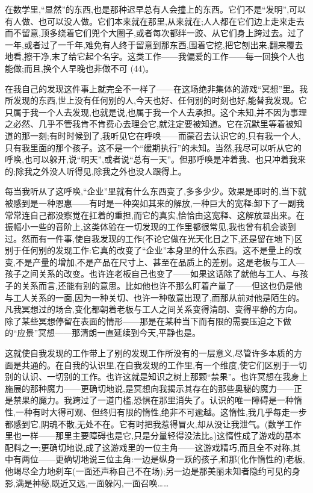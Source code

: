  在数学里,“显然”的东西,也是那种迟早总有人会撞上的东西。它们不是“发明”,可以有人做、也可以没人做。它们本来就在那里,从来就在;人人都在它们边上走来走去而不留意,顶多绕着它们兜个大圈子,或者每次都绊一跤、从它们身上跨过去。过了一年,或者过了一千年,难免有人终于留意到那东西,围着它挖,把它刨出来,翻来覆去地看,擦干净,末了给它起个名字。这类工作——我偏爱的工作——每一回换个人也能做;而且,换个人早晚也非做不可 (44)。

在我自己的发现这件事上就完全不一样了——在这场绝非集体的游戏“冥想”里。我所发现的东西,世上没有任何别的人,今天也好、任何别的时刻也好,能替我发现。它只属于我一个人去发现,也就是说,也属于我一个人去承担。这个未知,并不因为事理之必然、几乎不管我肯不肯费心去理会它,就注定要被知道。它在沉默里等着被知道的那一刻;有时时候到了,我听见它在呼唤——而蒙召去认识它的,只有我一个人,只有我里面的那个孩子。这不是一个“缓期执行”的未知。当然,我尽可以听从它的呼唤,也可以躲开,说“明天”,或者说“总有一天”。但那呼唤是冲着我、也只冲着我来的;除我之外没人听得见,除我之外也没人跟得上。

每当我听从了这呼唤,“企业”里就有什么东西变了,多多少少。效果是即时的,当下就被感到是一种恩惠——有时是一种突如其来的解放,一种巨大的宽释:卸下了一副我常常连自己都没察觉在扛着的重担,而它的真实,恰恰由这宽释、这解放显出来。在振幅小一些的音阶上,这类体验在一切发现的工作里都很常见,我也曾有机会谈到过。然而有一件事,使自我发现的工作(不论它做在光天化日之下,还是留在地下)区别于任何别的发现工作:它真的改变了“企业”本身里的什么东西。这不是量上的改变,不是产量的增加,不是产品在尺寸上、甚至在品质上的差别。这是老板与工人—孩子之间关系的改变。也许连老板自己也变了——如果这话除了就他与工人、与孩子的关系而言,还能有别的意思。比如他也许不那么盯着产量了——但这也仍是他与工人关系的一面,因为一种关切、也许一种敬意出现了,而那从前对他是陌生的。凡我冥想过的场合,变化都朝着老板与工人之间关系变得清朗、变得平静的方向。除了某些冥想停留在表面的情形——那是在某种当下而有限的需要压迫之下做的“应景”冥想——那清朗一直延续到今天,平静也是。

 这就使自我发现的工作带上了别的发现工作所没有的一层意义,尽管许多本质的方面是共通的。在自我的认识里,在自我发现的工作里,有一个维度,使它们区别于一切别的认识、一切别的工作。也许这就是知识之树上那颗“禁果”。也许冥想在我身上施展的那种魔力——更确切地说,是冥想向我揭示其存在的那些奥秘的魔力——正是禁果的魔力。我跨过了一道门槛,恐惧在那里消失了。认识的唯一障碍是一种惰性,一种有时大得可观、但终归有限的惰性,绝非不可逾越。这惰性,我几乎每走一步都感到它,阴魂不散,无处不在。它有时把我惹得冒火,却从没让我泄气。(数学工作里也一样——那里主要障碍也是它,只是分量轻得没法比。)这惰性成了游戏的基本配料之一;更确切地说,成了这游戏里的一位主角——这游戏精巧,而且全不对称,其中有两位——更确切地说三位主角:一边是纵身一跃的孩子,和那(化作惰性的)老板,他竭尽全力地刹车(一面还声称自己不在场);另一边是那美丽未知者隐约可见的身影,满是神秘,既近又远,一面躲闪,一面召唤……

